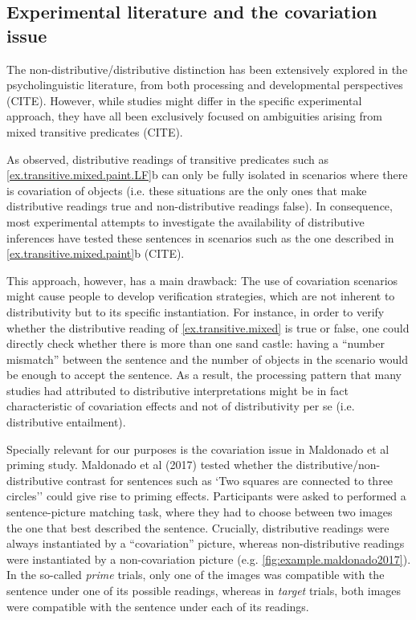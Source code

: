 



\subsection{Experimental literature and the covariation issue}

The non-distributive/distributive distinction has been extensively explored in the psycholinguistic literature, from both processing and developmental perspectives (CITE). However, while studies might differ in the specific experimental approach, they have all been exclusively focused on ambiguities arising from mixed transitive predicates (CITE). 


As observed, distributive readings of transitive predicates such as \ref{ex.transitive.mixed.paint.LF}b can only be fully isolated in scenarios where there is covariation of objects (i.e. these situations are the only ones that make distributive readings true and non-distributive readings false). In consequence, most experimental attempts to investigate the availability of distributive inferences have tested these sentences in scenarios such as the one described in \ref{ex.transitive.mixed.paint}b (CITE). 

This approach, however, has a main drawback: The use of covariation scenarios might cause people to develop verification strategies, which are not inherent to distributivity but to its specific instantiation. For instance, in order to verify whether the distributive reading of \ref{ex.transitive.mixed} is true or false, one could directly check whether there is more than one sand castle: having a ``number mismatch'' between the sentence and the number of objects in the scenario would be enough to accept the sentence. As a result, the processing pattern that many studies had attributed to distributive interpretations might be in fact characteristic of covariation effects and not of distributivity per se (i.e. distributive entailment). 

Specially relevant for our purposes is the covariation issue in  Maldonado et al priming study. 
Maldonado et al (2017) tested whether the distributive/non-distributive contrast for sentences such as `Two squares are connected to three circles'' could give rise to priming effects. 
Participants were asked to performed a sentence-picture matching task, where they had to choose between two images the one that best described the sentence. Crucially, distributive readings were always instantiated by a ``covariation'' picture, whereas non-distributive readings were instantiated by a non-covariation picture (e.g. \ref{fig:example.maldonado2017}). 
In the so-called \emph{prime} trials, only one of the images was compatible with the sentence under one of its possible readings, whereas in \emph{target} trials, both images were compatible with the sentence under each of its readings. 

